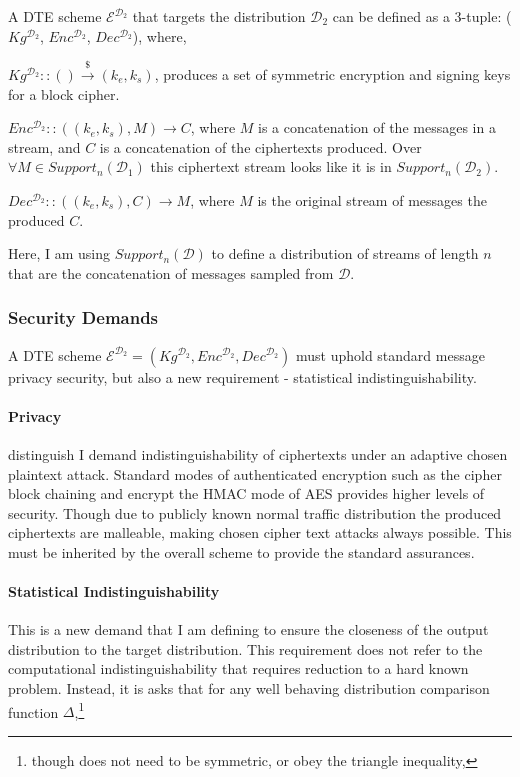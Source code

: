 \documentclass[ %
                    author={Samuel Russell},
                supervisor={Prof. Bogdan Warinschi},
                    degree={MEng},
                     title={Innocuous Ciphertexts},
                  subtitle={The DE-CENSOR Scheme},
                      type={research},
                      year={2018} ]{dissertation}
\begin{document}
A DTE scheme $\mathcal{E}^{\mathcal{D}_2}$ that targets the distribution $\mathcal{D}_2$ can be defined as a 3-tuple: ($Kg^{\mathcal{D}_2}$, $Enc^{\mathcal{D}_2}$, $Dec^{\mathcal{D}_2}$), where,

$Kg^{\mathcal{D}_2} :: () \xrightarrow{\$} (k_e,k_s)$, produces a set of symmetric encryption and signing keys for a block cipher.

$Enc^{\mathcal{D}_2} :: ((k_e,k_s), M) \rightarrow C$, where $M$ is a concatenation of the messages in a stream, and $C$ is a concatenation of the ciphertexts produced. Over $\forall M \in Support_n(\mathcal{D}_1)$ this ciphertext stream looks like it is in  $Support_n(\mathcal{D}_2)$.

$Dec^{\mathcal{D}_2} :: ((k_e,k_s), C) \rightarrow M$, where $M$ is the original stream of messages the produced $C$.

Here, I am using $Support_n(\mathcal{D})$ to define a distribution of streams of length $n$ that are the concatenation of messages sampled from $\mathcal{D}$.

\subsubsection{Security Demands}

A DTE scheme $\mathcal{E}^{\mathcal{D}_2} = (Kg^{\mathcal{D}_2}, Enc^{\mathcal{D}_2}, Dec^{\mathcal{D}_2})$ must uphold standard message privacy security, but also a new requirement - statistical indistinguishability.

\paragraph{Privacy}
distinguish 
I demand indistinguishability of ciphertexts under an adaptive chosen plaintext attack. Standard modes of authenticated encryption such as the cipher block chaining and encrypt the HMAC mode of AES provides higher levels of security.
Though due to publicly known normal traffic distribution the produced ciphertexts are malleable, making chosen cipher text attacks always possible. 
This must be inherited by the overall scheme to provide the standard assurances.

\paragraph{Statistical Indistinguishability}

This is a new demand that I am defining to ensure the closeness of the output distribution to the target distribution.
This requirement does not refer to the computational indistinguishability that requires reduction to a hard known problem.
Instead, it is asks that for any well behaving distribution comparison function $\Delta$,\footnote{though does not need to be symmetric, or obey the triangle inequality,}
\end{document}
